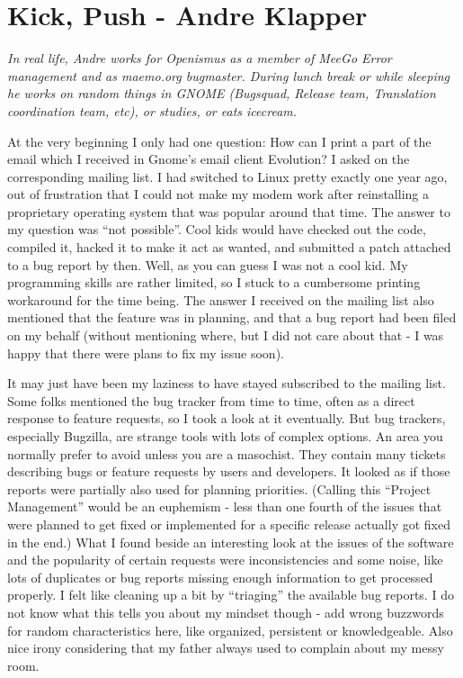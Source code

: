 \chapter{Kick, Push - Andre Klapper}

\textit{In real life, Andre works for Openismus as a member of MeeGo Error
management and as maemo.org bugmaster. During lunch break or while
sleeping he works on random things in GNOME (Bugsquad, Release team,
Translation coordination team, etc), or studies, or eats icecream.}

At the very beginning I only had one question: How can I print a part of the
email which I received in Gnome's email client Evolution? I asked on the
corresponding mailing list.
I had switched to Linux pretty exactly one year ago, out of frustration that I
could not make my modem work after reinstalling a proprietary operating system
that was popular around that time.
The answer to my question was ``not possible''. Cool kids would have checked out
the code, compiled it, hacked it to make it act as wanted, and submitted a patch
attached to a bug report by then. Well, as you can guess I was not a cool kid.
My programming skills are rather limited, so I stuck to a cumbersome printing
workaround for the time being. The answer I received on the mailing list also
mentioned that the feature was in planning, and that a bug report had been filed
on my behalf (without mentioning where, but I did not care about that - I was
happy that there were plans to fix my issue soon).

It may just have been my laziness to have stayed subscribed to the mailing list.
Some folks mentioned the bug tracker from time to time, often as a direct
response to feature requests, so I took a look at it eventually. But bug
trackers, especially Bugzilla, are strange tools with lots of complex options.
An area you normally prefer to avoid unless you are a masochist. They contain
many tickets describing bugs or feature requests by users and developers. It
looked as if those reports were partially also used for planning priorities.
(Calling this ``Project Management'' would be an euphemism - less than one
fourth of the issues that were planned to get fixed or implemented for a
specific release actually got fixed in the end.)
What I found beside an interesting look at the issues of the software and the
popularity of certain requests were inconsistencies and some noise, like lots of
duplicates or bug reports missing enough information to get processed properly.
I felt like cleaning up a bit by ``triaging'' the available bug reports. I do
not know what this tells you about my mindset though - add wrong buzzwords for
random characteristics here, like organized, persistent or knowledgeable. Also
nice irony considering that my father always used to complain about my messy
room.

